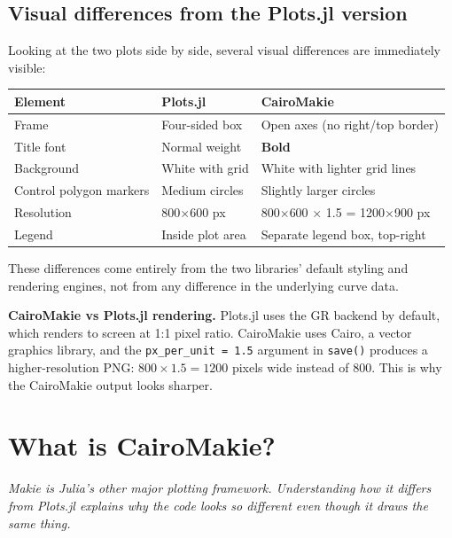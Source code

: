 \documentclass[12pt, a4paper]{article}
\newcommand{\cd}[1]{\texttt{#1}}
\begin{document}
\subsection{Visual differences from the Plots.jl version}

Looking at the two plots side by side, several visual
differences are immediately visible:

\begin{center}
\begin{tabular}{lll}
\toprule
Element & Plots.jl & CairoMakie \\
\midrule
Frame & Four-sided box & Open axes (no right/top border) \\
Title font & Normal weight & \textbf{Bold} \\
Background & White with grid & White with lighter grid lines \\
Control polygon markers & Medium circles & Slightly larger circles \\
Resolution & 800$\times$600 px & 800$\times$600 $\times$ 1.5 = 1200$\times$900 px \\
Legend & Inside plot area & Separate legend box, top-right \\
\bottomrule
\end{tabular}
\end{center}

These differences come entirely from the two libraries'
default styling and rendering engines, not from any
difference in the underlying curve data.

\begin{notebox}
\textbf{CairoMakie vs Plots.jl rendering.}
Plots.jl uses the GR backend by default, which renders
to screen at 1:1 pixel ratio.
CairoMakie uses Cairo, a vector graphics library,
and the \cd{px\_per\_unit = 1.5} argument in \cd{save()}
produces a higher-resolution PNG: $800 \times 1.5 = 1200$
pixels wide instead of 800.
This is why the CairoMakie output looks sharper.
\end{notebox}


\section{What is CairoMakie?}

\textit{Makie is Julia's other major plotting framework.
Understanding how it differs from Plots.jl explains why
the code looks so different even though it draws the same thing.}
\end{document}

